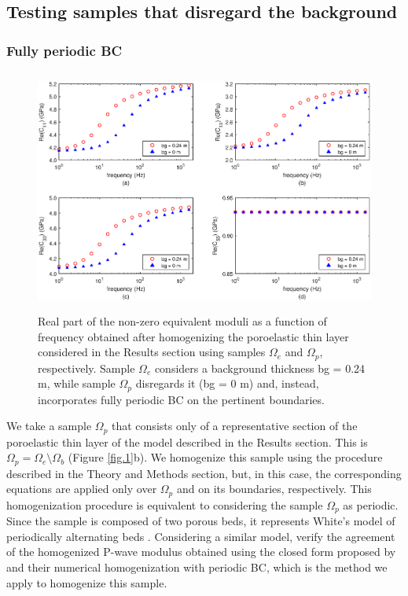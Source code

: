 \documentclass[draft]{agujournal2019}
\begin{document}
\subsection{Testing samples that disregard the background}

\subsubsection{Fully periodic BC}

\begin{figure}[!ht]
\centering
        \includegraphics[width= 120mm, height=80mm]{Figure4.eps}
\caption{Real part of the non-zero equivalent moduli as a function of frequency obtained after homogenizing the poroelastic thin layer considered in the Results section using samples $\Omega_e$ and $\Omega_p$, respectively. Sample $\Omega_e$ considers a background thickness bg = 0.24 m, while sample $\Omega_p$ disregards it (bg = 0 m) and, instead, incorporates fully periodic BC on the pertinent boundaries. }
\label{fig.4}
\end{figure}

We take a sample $\Omega_p$ that consists only of a representative section of the poroelastic thin layer of the model described in the Results section. This is $\Omega_p = \Omega_e  \setminus \Omega_b $ (Figure \ref{fig.1}b). We homogenize this sample using the procedure described in the Theory and Methods section, but, in this case, the corresponding equations are applied only  over $\Omega_p$ and on its boundaries, respectively. 
This homogenization procedure is equivalent to considering the sample $\Omega_p$ as periodic. Since the sample is composed of two porous beds, it represents White's model of periodically alternating beds \cite{White1975}. Considering a similar model,  verify the agreement of the homogenized P-wave modulus obtained using the closed form proposed by  and their numerical homogenization with periodic BC, which is the method we apply to homogenize this sample.
\end{document}
